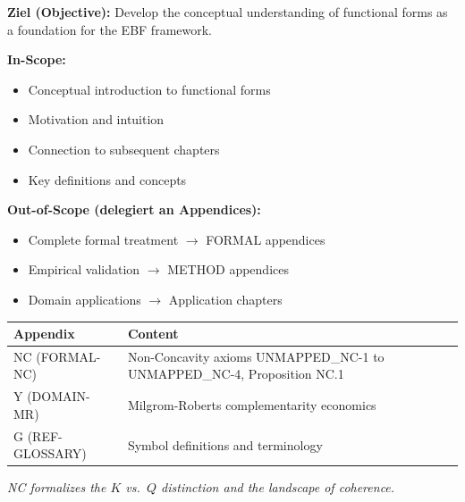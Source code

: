 \begin{tcolorbox}[
    colback=purple!5!white,
    colframe=purple!75!black,
    title={\textbf{Chapter Scope: Ziel / In-Scope / Out-of-Scope}},
    fonttitle=\bfseries
]

\textbf{Ziel (Objective):}
Develop the conceptual understanding of functional forms as a foundation for the EBF framework.

\vspace{0.3cm}
\textbf{In-Scope:}
\begin{itemize}[nosep]
    \item Conceptual introduction to functional forms
    \item Motivation and intuition
    \item Connection to subsequent chapters
    \item Key definitions and concepts
\end{itemize}

\vspace{0.3cm}
\textbf{Out-of-Scope (delegiert an Appendices):}
\begin{itemize}[nosep]
    \item Complete formal treatment $\rightarrow$ FORMAL appendices
    \item Empirical validation $\rightarrow$ METHOD appendices
    \item Domain applications $\rightarrow$ Application chapters
\end{itemize}

\end{tcolorbox}

\begin{tcolorbox}[
    colback=yellow!10!white,
    colframe=orange!75!black,
    title={\textbf{Appendix References for This Chapter}},
    fonttitle=\bfseries
]
\small
\begin{tabular}{@{}lp{8cm}@{}}
\textbf{Appendix} & \textbf{Content} \\
\midrule
NC (FORMAL-NC) & Non-Concavity axioms UNMAPPED_NC-1 to UNMAPPED_NC-4, Proposition NC.1 \\
Y (DOMAIN-MR) & Milgrom-Roberts complementarity economics \\
G (REF-GLOSSARY) & Symbol definitions and terminology \\
\end{tabular}

\medskip
\textit{NC formalizes the $K$ vs.\ $Q$ distinction and the landscape of coherence.}
\end{tcolorbox}

